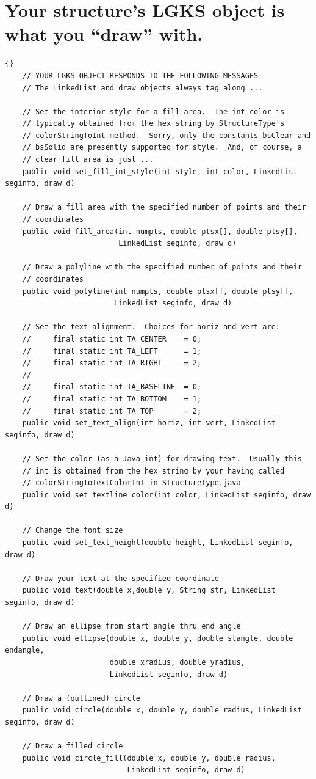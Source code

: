 \documentclass[11pt,letterpaper]{book}
\begin{document}
\section{Your structure's LGKS object is what you ``draw'' with.}

\begin{lstlisting}{}
    // YOUR LGKS OBJECT RESPONDS TO THE FOLLOWING MESSAGES
    // The LinkedList and draw objects always tag along ...
   
    // Set the interior style for a fill area.  The int color is
    // typically obtained from the hex string by StructureType's
    // colorStringToInt method.  Sorry, only the constants bsClear and
    // bsSolid are presently supported for style.  And, of course, a
    // clear fill area is just ...
    public void set_fill_int_style(int style, int color, LinkedList seginfo, draw d) 

    // Draw a fill area with the specified number of points and their
    // coordinates
    public void fill_area(int numpts, double ptsx[], double ptsy[], 
                          LinkedList seginfo, draw d) 
    
    // Draw a polyline with the specified number of points and their
    // coordinates
    public void polyline(int numpts, double ptsx[], double ptsy[], 
                         LinkedList seginfo, draw d) 
    
    // Set the text alignment.  Choices for horiz and vert are:
    //     final static int TA_CENTER    = 0;   
    //     final static int TA_LEFT      = 1;
    //     final static int TA_RIGHT     = 2;
    // 
    //     final static int TA_BASELINE  = 0;
    //     final static int TA_BOTTOM    = 1;
    //     final static int TA_TOP       = 2;  
    public void set_text_align(int horiz, int vert, LinkedList seginfo, draw d) 

    // Set the color (as a Java int) for drawing text.  Usually this
    // int is obtained from the hex string by your having called
    // colorStringToTextColorInt in StructureType.java
    public void set_textline_color(int color, LinkedList seginfo, draw d) 

    // Change the font size
    public void set_text_height(double height, LinkedList seginfo, draw d) 
    
    // Draw your text at the specified coordinate
    public void text(double x,double y, String str, LinkedList seginfo, draw d) 
   
    // Draw an ellipse from start angle thru end angle
    public void ellipse(double x, double y, double stangle, double endangle, 
                        double xradius, double yradius,
                        LinkedList seginfo, draw d) 
 
    // Draw a (outlined) circle
    public void circle(double x, double y, double radius, LinkedList seginfo, draw d) 
    
    // Draw a filled circle
    public void circle_fill(double x, double y, double radius, 
                            LinkedList seginfo, draw d) 
\end{lstlisting}
\end{document}
